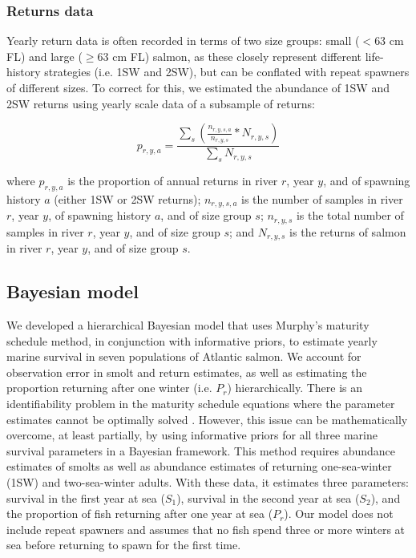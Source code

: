 \documentclass[12pt]{article}
\newcommand{\So}{$S_{1}$\xspace}
\newcommand{\St}{$S_{2}$\xspace}
\newcommand{\Pg}{$P_r$\xspace}
\begin{document}
\subsubsection*{Returns data}

Yearly return data is often recorded in terms of two size groups: small ($< 63$ cm
FL) and large ($\geq 63$ cm FL) salmon, as these closely represent different
life-history strategies (i.e. 1SW and 2SW), but can be conflated with repeat
spawners of different sizes. To correct for this, we estimated the abundance
of 1SW and 2SW returns using yearly scale data of a subsample of returns:

\begin{equation}
    p_{r,y,a} = \frac{\sum_{s}{(\frac{n_{r,y,s,a}}{n_{r,y,s}} * N_{r,y,s})}}{\sum_{s}{N_{r,y,s}}}
\end{equation}

where $p_{r,y,a}$ is the proportion of annual returns in river $r$, year $y$,
and of spawning history $a$ (either 1SW or 2SW returns); $n_{r,y,s,a}$ is the
number of samples in river $r$, year $y$, of spawning history $a$, and of size
group $s$; $n_{r,y,s}$ is the total number of samples in river $r$, year $y$,
and of size group $s$; and $N_{r,y,s}$ is the returns of salmon
in river $r$, year $y$, and of size group $s$.

\subsection*{Bayesian model}

We developed a hierarchical Bayesian model that uses Murphy's maturity
schedule method, in conjunction with informative priors, to estimate yearly
marine survival in seven populations of Atlantic salmon. We account for
observation error in smolt and return estimates, as well as estimating the
proportion returning after one winter (i.e. \Pg) hierarchically.
There is an identifiability problem in the maturity schedule equations where
the parameter estimates cannot be optimally solved \citep{Chaput2003a}.
However, this issue can be mathematically overcome, at least partially, by
using informative priors for all three marine survival parameters in a
Bayesian framework.
This method requires abundance estimates of smolts as well as abundance estimates
of returning one-sea-winter (1SW) and two-sea-winter adults. With these data,
it estimates three parameters: survival in the first year at sea (\So), survival
in the second year at sea (\St), and the proportion of fish returning after one
year at sea (\Pg). 
Our model does not include repeat spawners and assumes that no fish spend
three or more winters at sea before returning to spawn for the first time.
\end{document}
